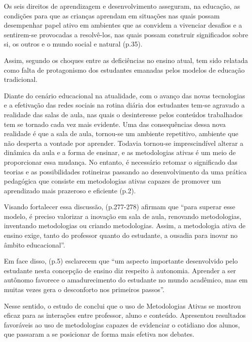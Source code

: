 \begin{citacao}
    Os seis direitos de aprendizagem e desenvolvimento asseguram, na educação, as condições para que as crianças aprendam em situações nas quais possam desempenhar papel ativo em ambientes que as convidem a vivenciar desafios e a sentirem-se provocadas a resolvê-los, nas quais possam construir significados sobre si, os outros e o mundo social e natural \cite{Educacao.SecretariadeEducacaoFundamental2017} (p.35).
\end{citacao}

Assim, segundo  os choques entre as deficiências no ensino atual, tem sido relatada como falta de protagonismo dos estudantes emanadas pelos modelos de educação tradicional.

Diante do cenário educacional na atualidade, com o avanço das novas tecnologias e a efetivação das redes sociais na rotina diária dos estudantes tem-se agravado a realidade das salas de aula, nas quais o desinteresse pelos conteúdos trabalhados tem se tornado cada vez mais evidente. Uma das consequências dessa nova realidade é que a sala de aula, tornou-se um ambiente repetitivo, ambiente que não desperta a vontade por aprender. Todavia tornou-se imprescindível alterar a dinâmica da aula e a forma de ensinar, e as metodologias ativas é um meio de proporcionar essa mudança. No entanto, é necessário retomar o significado das teorias e as possibilidades rotineiras passando ao desenvolvimento da uma prática pedagógica que consiste em metodologias ativas capazes de promover um aprendizado mais prazeroso e eficiente \cite{DUMONT2016} (p.2).

Visando fortalecer essa discussão,  (p.277-278) afirmam que ``para superar esse modelo, é preciso valorizar a inovação em sala de aula, renovando metodologias, inventando metodologias ou criando metodologias. Assim, a metodologia ativa de ensino exige, tanto do professor quanto do estudante, a ousadia para inovar no âmbito educacional''.

Em face disso,  (p.5) esclarecem que ``um aspecto importante desenvolvido pelo estudante nesta concepção de ensino diz respeito à autonomia. Aprender a ser autônomo favorece o amadurecimento do estudante no mundo acadêmico, mas em muitas vezes gera o desconforto nos primeiros passos''.

Nesse sentido, o estudo de  conclui que o uso de Metodologias Ativas se mostrou eficaz para as interações entre professor, aluno e conteúdo.  Apresentou resultados favoráveis ao uso de metodologias capazes de evidenciar o cotidiano dos alunos, que passaram a se posicionar de forma mais efetiva nos debates.

